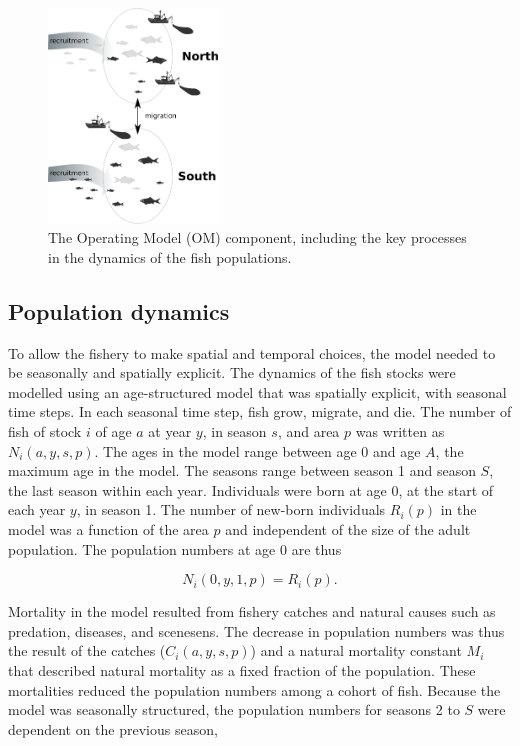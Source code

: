 \documentclass[12pt,oneline,a4paper,numbib]{ouparticle}
\numberwithin{equation}{subsection} %
\begin{document}
\begin{figure}[!h]
\centering
\includegraphics[width=0.4\textwidth]{Figures/Areadynamics.eps} 
\caption{The Operating Model (OM) component, including the key processes in the dynamics of the fish populations.}
\label{fig:stockdyn}
\end{figure}

\subsection{Population dynamics}


To allow the fishery to make spatial and temporal choices, the model needed to be seasonally and spatially explicit. The dynamics of the fish stocks were modelled using an age-structured model that was spatially explicit, with seasonal time steps. In each seasonal time step, fish grow, migrate, and die. The number of fish of stock $i$ of age $a$ at year $y$, in season $s$, and area $p$ was written as $N_i (a, y, s, p)$.  The ages in the model range between age 0 and age $A$, the maximum age in the model. The seasons range between season 1 and season $S$, the last season within each year. Individuals were born at age 0, at the start of each year $y$, in season 1. The number of new-born individuals $R_i (p)$ in the model was a function of the area $p$ and independent of the size of the adult population. The population numbers at age 0 are thus
 
\begin{equation}
N_i (0, y, 1, p) = R_i (p).
\end{equation}

Mortality in the model resulted from fishery catches and natural causes such as predation, diseases, and scenesens. The decrease in population numbers was thus the result of the catches ($C_i (a, y, s, p)$) and a natural mortality constant $M_i$ that described natural mortality as a fixed fraction of the population. These mortalities reduced the population numbers among a cohort of fish. Because the model was seasonally structured, the population numbers for seasons 2 to $S$ were dependent on the previous season,
\end{document}

